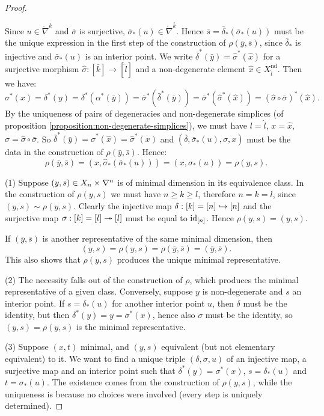 \begin{proof}
\begin{claimproof}
Since $u\in\ring\nabla^{k}$ and $\bar \sigma$ is surjective, $\bar\sigma_*(u)\in\ring\nabla^{\bar k}$. Hence $\bar s=\bar\delta_*(\bar\sigma_*(u))$ must be the unique expression in the first step of the construction of $\rho(\bar y,\bar s)$, since $\bar\delta_*$ is injective and $\bar\sigma_*(u)$ is an interior point. We write $\bar\delta^*(\bar y)=\hat\sigma^*(\hat x)$ for a surjective morphism $\hat\sigma:[\bar k]\to[\hat l]$ and a non-degenerate element $\hat x\in X_{\hat l}^\text{nd}$. Then we have:
\[\sigma^*(x)=\delta^*(y)=\delta^*(\alpha^*(\bar y))=\bar\sigma^*(\bar\delta^*(\bar y))=\bar\sigma^*(\hat\sigma^*(\hat x))=(\hat\sigma\circ\bar\sigma)^*(\hat x).\]
By the uniqueness of pairs of degeneracies and non-degenerate simplices (of proposition \ref{proposition:non-degenerate-simplices}), we must have $l=\hat l$, $x=\hat x$, $\sigma=\hat\sigma\circ\bar\sigma$. So $\bar\delta^*(\bar y)=\hat\sigma^*(\hat x)=\hat\sigma^*(x)$ and $(\bar\delta,\bar\sigma_*(u),\hat\sigma,x)$ must be the data in the construction of $\rho(\bar y,\bar s)$. Hence:
\[\rho(\bar y,\bar s)=(x,\hat\sigma_*(\bar\sigma_*(u)))=(x,\sigma_*(u))=\rho(y,s).\]
\end{claimproof}

(1) Suppose $(y,s)\in X_n\times\nabla^n$ is of minimal dimension in its equivalence class. In the construction of $\rho(y,s)$ we must have $n\ge k\ge l$, therefore $n=k=l$, since $(y,s)\sim \rho(y,s)$. Clearly the injective map $\delta:[k]=[n]\hookrightarrow[n]$ and the surjective map $\sigma:[k]=[l]\twoheadrightarrow[l]$ must be equal to $\operatorname{id}_{[n]}$. Hence $\rho(y,s)=(y,s)$.

If $(\bar y,\bar s)$ is another representative of the same minimal dimension, then
\[(y,s)=\rho(y,s)=\rho(\bar y,\bar s)=(\bar y,\bar s).\]
This also shows that $\rho(y,s)$ produces the unique minimal representative.

(2) The necessity falls out of the construction of $\rho$, which produces the minimal representative of a given class. Conversely, suppose $y$ is non-degenerate and $s$ an interior point. If $s=\delta_*(u)$ for another interior point $u$, then $\delta$ must be the identity, but then $\delta^*(y)=y=\sigma^*(x)$, hence also $\sigma$ must be the identity, so $(y,s)=\rho(y,s)$ is the minimal representative.

(3) Suppose $(x,t)$ minimal, and $(y,s)$ equivalent (but not elementary equivalent) to it. We want to find a unique triple $(\delta,\sigma,u)$ of an injective map, a surjective map and an interior point such that $\delta^*(y)=\sigma^*(x)$, $s=\delta_*(u)$ and $t=\sigma_*(u)$. The existence comes from the construction of $\rho(y,s)$, while the uniqueness is because no choices were involved (every step is uniquely determined).
\end{proof}

